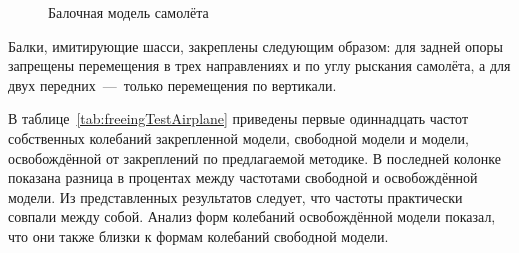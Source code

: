 \begin{figure}[!htb]
    \centerfloat
    \caption{Балочная модель самолёта} \label{fig:freeingAircraft}
\end{figure}

Балки, имитирующие шасси, закреплены следующим образом: для задней опоры запрещены перемещения в трех направлениях и по углу рыскания самолёта, а для двух передних~---~только перемещения по вертикали.

В таблице~\ref{tab:freeingTestAirplane} приведены первые одиннадцать частот собственных колебаний закрепленной модели, свободной модели и модели, освобождённой от закреплений по предлагаемой методике. В последней колонке показана разница в процентах между частотами свободной и освобождённой модели. Из представленных результатов следует, что частоты практически совпали между собой. Анализ форм колебаний освобождённой модели показал, что они также близки к формам колебаний свободной модели.


